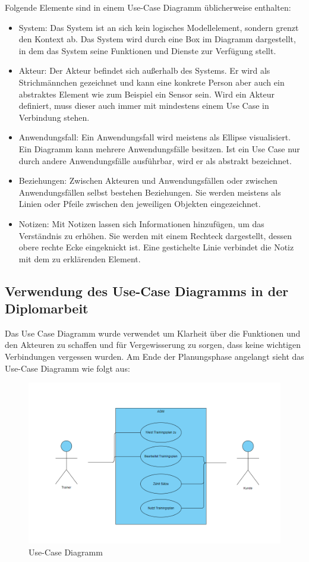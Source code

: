 Folgende Elemente sind in einem Use-Case Diagramm üblicherweise enthalten:
\begin{itemize}
    \item System: Das System ist an sich kein logisches Modellelement, sondern grenzt den Kontext ab. Das System wird durch eine Box im Diagramm dargestellt, in dem das System seine Funktionen und Dienste zur Verfügung stellt.
    \item Akteur: Der Akteur befindet sich außerhalb des Systems. Er wird als Strichmännchen gezeichnet und kann eine konkrete Person aber auch ein abstraktes Element wie zum Beispiel ein Sensor sein. Wird ein Akteur definiert, muss dieser auch immer mit mindestens einem Use Case in Verbindung stehen.
    \item Anwendungsfall: Ein Anwendungsfall wird meistens als Ellipse visualisiert. Ein Diagramm kann mehrere Anwendungsfälle besitzen. Ist ein Use Case nur durch andere Anwendungsfälle ausführbar, wird er als abstrakt bezeichnet.
    \item Beziehungen: Zwischen Akteuren und Anwendungsfällen oder zwischen Anwendungsfällen selbst bestehen Beziehungen. Sie werden meistens als Linien oder Pfeile zwischen den jeweiligen Objekten eingezeichnet.
    \item Notizen: Mit Notizen lassen sich Informationen hinzufügen, um das Verständnis zu erhöhen. Sie werden mit einem Rechteck dargestellt, dessen obere rechte Ecke eingeknickt ist. Eine gestichelte Linie verbindet die Notiz mit dem zu erklärenden Element.
    
    \end{itemize}
    \pagebreak
    \subsection{Verwendung des Use-Case Diagramms in der Diplomarbeit}

    Das Use Case Diagramm wurde verwendet um Klarheit über die Funktionen und den Akteuren zu schaffen und für Vergewisserung zu sorgen, dass keine wichtigen Verbindungen vergessen wurden.
    Am Ende der Planungsphase angelangt sieht das Use-Case Diagramm wie folgt aus:

    \begin{figure}[H]
        \centering
        \includegraphics[scale=0.6]{pics/Use Case Diagramm.png}
        \caption{Use-Case Diagramm}
    \end{figure}
    